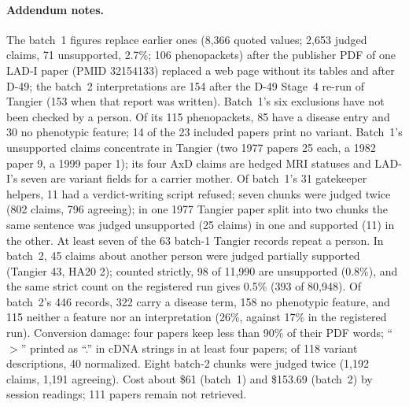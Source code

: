 \documentclass{article} %
\begin{document}
\paragraph{Addendum notes.} The batch~1 figures replace earlier ones (8,366 quoted values; 2,653 judged claims, 71 unsupported, 2.7\%; 106 phenopackets) after the publisher PDF of one LAD-I paper (PMID 32154133) replaced a web page without its tables and after D-49; the batch~2 interpretations are 154 after the D-49 Stage~4 re-run of Tangier (153 when that report was written). Batch~1's six exclusions have not been checked by a person. Of its 115 phenopackets, 85 have a disease entry and 30 no phenotypic feature; 14 of the 23 included papers print no variant. Batch~1's unsupported claims concentrate in Tangier (two 1977 papers 25 each, a 1982 paper 9, a 1999 paper 1); its four AxD claims are hedged MRI statuses and LAD-I's seven are variant fields for a carrier mother. Of batch~1's 31 gatekeeper helpers, 11 had a verdict-writing script refused; seven chunks were judged twice (802 claims, 796 agreeing); in one 1977 Tangier paper split into two chunks the same sentence was judged unsupported (25 claims) in one and supported (11) in the other. At least seven of the 63 batch-1 Tangier records repeat a person. In batch~2, 45 claims about another person were judged partially supported (Tangier 43, HA20 2); counted strictly, 98 of 11,990 are unsupported (0.8\%), and the same strict count on the registered run gives 0.5\% (393 of 80,948). Of batch~2's 446 records, 322 carry a disease term, 158 no phenotypic feature, and 115 neither a feature nor an interpretation (26\%, against 17\% in the registered run). Conversion damage: four papers keep less than 90\% of their PDF words; ``$>$'' printed as ``.'' in cDNA strings in at least four papers; of 118 variant descriptions, 40 normalized. Eight batch-2 chunks were judged twice (1,192 claims, 1,191 agreeing). Cost about \$61 (batch~1) and \$153.69 (batch~2) by session readings; 111 papers remain not retrieved.

\clearpage
\end{document}

